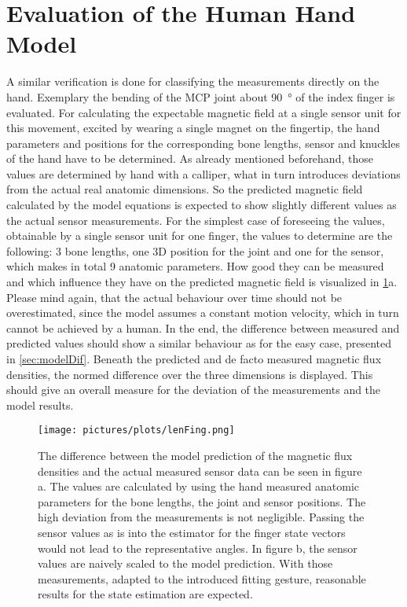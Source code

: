 \section{Evaluation of the Human Hand Model} \label{sec:evalHand}

A similar verification is done for classifying the measurements directly on the hand. Exemplary the bending of the \ac{MCP} joint about \SI{90}{\degree} of the index finger is evaluated. For calculating the expectable magnetic field at a single sensor unit for this movement, excited by wearing a single magnet on the fingertip, the hand parameters and positions for the corresponding bone lengths, sensor and knuckles of the hand have to be determined. As already mentioned beforehand, those values are determined by hand with a calliper, what in turn introduces deviations from the actual real anatomic dimensions. So the predicted magnetic field calculated by the model equations is expected to show slightly different values as the actual sensor measurements. For the simplest case of foreseeing the values, obtainable by a single sensor unit for one finger, the values to determine are the following: 3 bone lengths, one 3D position for the joint and one for the sensor, which makes in total 9 anatomic parameters. How good they can be measured and which influence they have on the predicted magnetic field is visualized in \ref{fig:measHand}a. Please mind again, that the actual behaviour over time should not be overestimated, since the model assumes a constant motion velocity, which in turn cannot be achieved by a human. In the end, the difference between measured and predicted values should show a similar behaviour as for the easy case, presented in \ref{sec:modelDif}. Beneath the predicted and de facto measured magnetic flux densities, the normed difference over the three dimensions is displayed. This should give an overall measure for the deviation of the measurements and the model results.\\
\begin{figure}[!htb]
\centering
\texttt{[image: pictures/plots/lenFing.png]}
\caption[Influence of erroneous hand dimensions on model predictions]
{The difference between the model prediction of the magnetic flux densities and the actual measured sensor data can be seen in figure a. The values are calculated by using the hand measured anatomic parameters for the bone lengths, the joint and sensor positions. The high deviation from the measurements is not negligible. Passing the sensor values as is into the estimator for the finger state vectors would not lead to the representative angles. In figure b, the sensor values are naively scaled to the model prediction. With those measurements, adapted to the introduced fitting gesture, reasonable results for the state estimation are expected. }
\label{fig:measHand}
\end{figure}
